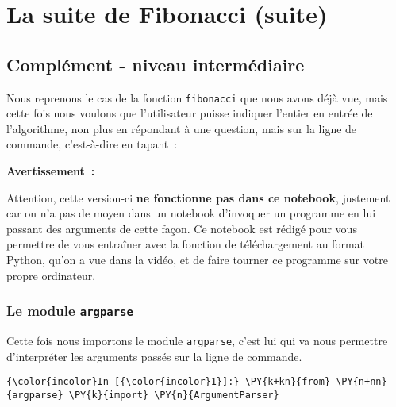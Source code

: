     
    
    
    

    

    \hypertarget{la-suite-de-fibonacci-suite}{%
\section{La suite de Fibonacci
(suite)}\label{la-suite-de-fibonacci-suite}}

    \hypertarget{compluxe9ment---niveau-intermuxe9diaire}{%
\subsection{Complément - niveau
intermédiaire}\label{compluxe9ment---niveau-intermuxe9diaire}}

    Nous reprenons le cas de la fonction \texttt{fibonacci} que nous avons
déjà vue, mais cette fois nous voulons que l'utilisateur puisse indiquer
l'entier en entrée de l'algorithme, non plus en répondant à une
question, mais sur la ligne de commande, c'est-à-dire en tapant~:

\begin{Shaded}
\begin{Highlighting}[frame=lines,framerule=0.6mm,rulecolor=\color{asisframecolor}]
\NormalTok{$ }
\end{Highlighting}
\end{Shaded}

    \textbf{Avertissement~:}

Attention, cette version-ci \textbf{ne fonctionne pas dans ce notebook},
justement car on n'a pas de moyen dans un notebook d'invoquer un
programme en lui passant des arguments de cette façon. Ce notebook est
rédigé pour vous permettre de vous entraîner avec la fonction de
téléchargement au format Python, qu'on a vue dans la vidéo, et de faire
tourner ce programme sur votre propre ordinateur.

    \hypertarget{le-module-argparse}{%
\subsubsection{\texorpdfstring{Le module
\texttt{argparse}}{Le module argparse}}\label{le-module-argparse}}

    Cette fois nous importons le module \texttt{argparse}, c'est lui qui va
nous permettre d'interpréter les arguments passés sur la ligne de
commande.

    \begin{Verbatim}[commandchars=\\\{\},frame=single,framerule=0.3mm,rulecolor=\color{cellframecolor}]
{\color{incolor}In [{\color{incolor}1}]:} \PY{k+kn}{from} \PY{n+nn}{argparse} \PY{k}{import} \PY{n}{ArgumentParser}
\end{Verbatim}


